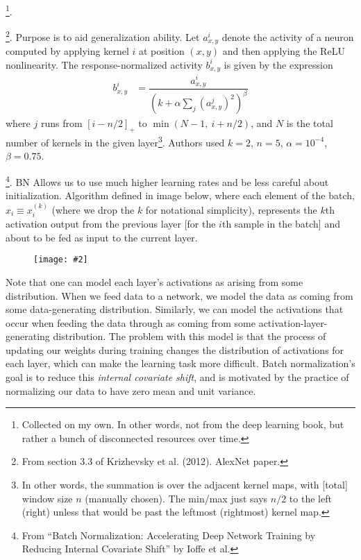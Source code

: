 \documentclass[11pt]{article}
\newcommand\myfig[2][0.3\textwidth]{\begin{figure}[h!]\centering\texttt{[image: \#2]}\end{figure}}
\newcommand\myspace[1][]{\vspace{#1\bigskipamount}}
\newcommand\p{\Needspace{10\baselineskip} \noindent}
\begin{document}
\myspace
\p {}\footnote{Collected on my own. In other words, not from the deep learning book, but rather a bunch of disconnected resources over time.}. 
\begin{compactitem}
	\item {}\footnote{From section 3.3 of Krizhevsky et al. (2012). AlexNet paper.}. Purpose is to aid generalization ability. Let $a^i_{x, y}$ denote the activity of a neuron computed by applying kernel $i$ at position $(x, y)$ and then applying the ReLU nonlinearity. The response-normalized activity $b^i_{x,y}$ is given by the expression
	\begin{align}
		b^i_{x,y} &= \dfrac{a^i_{x,y}}{
			\left(k + \alpha \sum_j \left(a^j_{x,y} \right)^2	 \right)^{\beta}
		}
	\end{align}
	where $j$ runs from $\left[i - n/2\right]_+$ to $\min(N-1, ~ i + n/2)$, and $N$ is the total number of kernels in the given layer\footnote{In other words, the summation is over the adjacent kernel maps, with [total] window size $n$ (manually chosen). The min/max just says $n/2$ to the left (right) unless that would be past the leftmost (rightmost) kernel map.}. Authors used $k = 2$, $n = 5$, $\alpha = 10^{-4}$, $\beta = 0.75$. 
	
	\item {}\footnote{From ``Batch Normalization: Accelerating Deep Network Training by Reducing Internal Covariate Shift'' by Ioffe et al.}. BN Allows us to use much higher learning rates and be less careful about initialization. Algorithm defined in image below, where each element of the batch, $x_i \equiv x_i^{(k)}$ (where we drop the $k$ for notational simplicity), represents the $k$th activation output from the previous layer [for the $i$th sample in the batch] and about to be fed as input to the current layer.
	\myfig[0.5\textwidth]{figs/batch_norm.png}
	
	 Note that one can model each layer's activations as arising from some distribution. When we feed data to a network, we model the data as coming from some data-generating distribution. Similarly, we can model the activations that occur when feeding the data through as coming from some activation-layer-generating distribution. The problem with this model is that the process of updating our weights during training changes the distribution of activations for each layer, which can make the learning task more difficult. Batch normalization's goal is to reduce this \textit{internal covariate shift}, and is motivated by the practice of normalizing our data to have zero mean and unit variance.
	
\end{compactitem}
\end{document}
